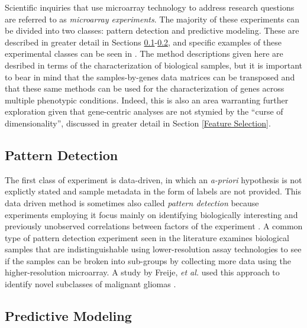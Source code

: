 Scientific inquiries that use microarray technology to address research
questions are referred to as \emph{microarray experiments}.  The majority of
these experiments can be divided into two classes: pattern detection and
predictive modeling.  These are described in greater detail in Sections
\ref{Pattern Detection}-\ref{Predictive Modeling}, and specific examples of
these experimental classes can be seen in \cite{Dudoit2003ICM, Azuaje2003cge,
Stanford2003cac, PMID_12413821, PMID_15843092, PMID_15867208}.  The method
descriptions given here are desribed in terms of the characterization of
biological samples, but it is important to bear in mind that the
samples-by-genes data matrices can be transposed and that these same methods
can be used for the characterization of genes across multiple phenotypic
conditions.  Indeed, this is also an area warranting further exploration given
that gene-centric analyses are not stymied by the ``curse of dimensionality'',
discussed in greater detail in Section \ref{Feature Selection}.

\subsection{Pattern Detection}\label{Pattern Detection}

The first class of experiment is data-driven, in which an \emph{a-priori}
hypothesis is not explictly stated and sample metadata in the form of labels
are not provided.  This data driven method is sometimes also called
\emph{pattern detection} because experiments employing it focus mainly on
identifying biologically interesting and previously unobserved correlations
between factors of the experiment \cite{Dubitzky2003IMD}.  A common type of
pattern detection experiment seen in the literature examines biological samples
that are indistinguishable using lower-resolution assay technologies to see if
the samples can be broken into sub-groups by collecting more data using the
higher-resolution microarray.   A study by Freije, \emph{et al.} used this
approach to identify novel subclasses of malignant gliomas
\cite{PMID_15374961}.

\subsection{Predictive Modeling}\label{Predictive Modeling}

